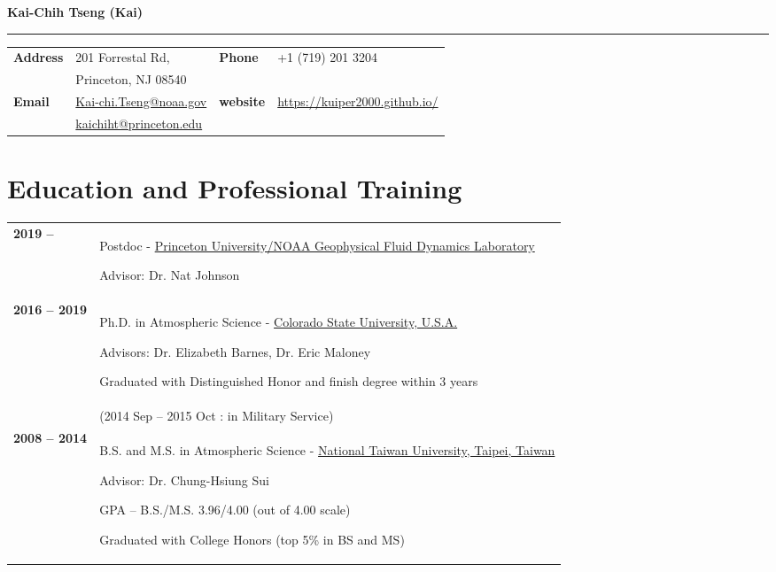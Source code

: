 \documentclass{article}
\begin{document}
{\huge\color{airforceblue}\textbf{Kai-Chih Tseng (Kai)}\par}
\rule{\textwidth}{0.5mm}\par

\vspace{5ex}

\begin{tabular}{
		>{\bfseries}p{.20\linewidth}
		p{.4\linewidth}
		>{\bfseries}p{.1\linewidth}
		p{.25\linewidth}
	}
	Address       & 201 Forrestal Rd,          &  Phone  & +1 (719) 201 3204 \\
	              & Princeton, NJ 08540          &    &  \\
	Email         & \href{mailto:Kai-chi.Tseng@noaa.gov}{Kai-chi.Tseng@noaa.gov} & website & \href{https://kuiper2000.github.io/}{https://kuiper2000.github.io/}    \\
                  & \href{mailto:kaichiht@princeton.edu}{kaichiht@princeton.edu} &       &     \\
\end{tabular}

\section{\color{airforceblue}Education and Professional Training}
\begin{tabular}{>{\bfseries}p{2.5cm}p{\linewidth-2.5cm\relax}}
	2019  --   & Postdoc -
	\href{https://www.princeton.edu/}{Princeton University/NOAA Geophysical Fluid Dynamics Laboratory}\par
	Advisor: Dr. Nat Johnson \par
    \\
	2016  -- 2019  & Ph.D. in Atmospheric Science -
	\href{https://www.colostate.edu/}{Colorado State University, U.S.A.}\par
	Advisors: Dr. Elizabeth Barnes, Dr. Eric Maloney \par
	Graduated with Distinguished Honor and finish degree within 3 years\par
	\\
	 & (2014 Sep -- 2015 Oct : in Military Service) \par
	\\
	2008 -- 2014 & B.S. and M.S. in Atmospheric Science -
	\href{https://www.ntu.edu.tw/}{National Taiwan University,
	Taipei, Taiwan}\par
	Advisor: Dr. Chung-Hsiung Sui \par
	GPA -- B.S./M.S. 3.96/4.00 (out of 4.00 scale) \par
	Graduated with College Honors (top 5\% in BS and MS) \par
	

\end{tabular}
\end{document}
